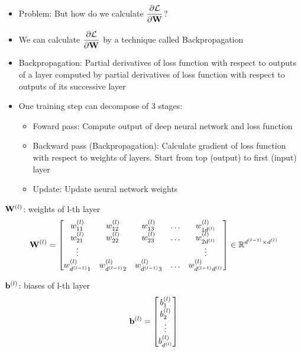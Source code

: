 \documentclass[14pt, a4paper]{article}
\numberwithin{equation}{section}
\numberwithin{algorithm}{section}
\numberwithin{figure}{section}
\begin{document}
\begin{itemize}
  \item Problem: But how do we calculate $\dfrac{\partial \mathcal{L}}{\partial \bold{W}}$?
  \item We can calculate $\dfrac{\partial \mathcal{L}}{\partial \bold{W}}$ by a technique called Backpropagation
\end{itemize}

\begin{itemize}
  \item Backpropagation: Partial derivatives of loss function with respect to outputs of a layer computed by partial derivatives of loss function with respect to outputs of its successive layer
    \item One training step can decompose of 3 stages:
  \begin{itemize}
    \item Foward pass: Compute output of deep neural network and loss function
       \item Backward pass (Backpropagation): Calculate gradient of loss function with respect to weights of layers. Start from top (output) to first (input) layer
        \item Update: Update neural network weights
  \end{itemize}
\end{itemize}

$\bold{W}^{(l)}$: weights of l-th layer
\begin{equation*}
		\bold{W}^{(l)}=\begin{bmatrix} w_{11}^{(l)} & w_{12}^{(l)} & w_{13}^{(l)} & \dots & w_{1d^{(l)}}^{(l)} \\ w_{21}^{(l)} & w_{22}^{(l)} & w_{23}^{(l)} & \dots & w_{2d^{(l)}}^{(l)} \\ \vdots & \thickspace & \thickspace & \thickspace & \vdots \\ w_{d^{(l-1)}1}^{(l)} & w_{d^{(l-1)}2}^{(l)} & w_{d^{(l-1)}3}^{(l)} & \dots & w_{d^{(l-1)}d^{(l)}}^{(l)}\end{bmatrix} \in \mathbb{R}^{d^{(l-1)} \times d^{(l)}}
\end{equation*}

$\bold{b}^{(l)}$: biases of l-th layer
\begin{equation*}
	  \bold{b}^{(l)}=\begin{bmatrix} b_1^{(l)} \\  b_2^{(l)} \\ \vdots \\ b_{d^{(l)}}^{(l)} \end{bmatrix}
\end{equation*}
\end{document}
